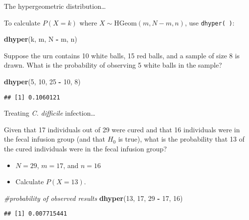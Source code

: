\documentclass[
  ignorenonframetext,
  aspectratio=169]{beamer}
\newenvironment{Shaded}{\begin{snugshade}}{\end{snugshade}}
\newcommand{\CommentTok}[1]{\textcolor[rgb]{0.56,0.35,0.01}{\textit{#1}}}
\newcommand{\DecValTok}[1]{\textcolor[rgb]{0.00,0.00,0.81}{#1}}
\newcommand{\FunctionTok}[1]{\textcolor[rgb]{0.13,0.29,0.53}{\textbf{#1}}}
\newcommand{\NormalTok}[1]{#1}
\newcommand{\SpecialCharTok}[1]{\textcolor[rgb]{0.81,0.36,0.00}{\textbf{#1}}}
\begin{document}
\begin{frame}[fragile]{The hypergeometric distribution\ldots{}}
\protect\hypertarget{the-hypergeometric-distribution-1}{}
\small

To calculate \(P(X = k)\) where \(X \sim \text{HGeom}(m, N - m, n)\),
use \texttt{dhyper( )}:

\vspace{0.2cm}

\scriptsize

\begin{Shaded}
\begin{Highlighting}[]
\FunctionTok{dhyper}\NormalTok{(k, m, N }\SpecialCharTok{{-}}\NormalTok{ m, n)}
\end{Highlighting}
\end{Shaded}

\small

Suppose the urn contains 10 white balls, 15 red balls, and a sample of
size 8 is drawn. What is the probability of observing 5 white balls in
the sample?

\scriptsize

\begin{Shaded}
\begin{Highlighting}[]
\FunctionTok{dhyper}\NormalTok{(}\DecValTok{5}\NormalTok{, }\DecValTok{10}\NormalTok{, }\DecValTok{25} \SpecialCharTok{{-}} \DecValTok{10}\NormalTok{, }\DecValTok{8}\NormalTok{)}
\end{Highlighting}
\end{Shaded}

\begin{verbatim}
## [1] 0.1060121
\end{verbatim}
\end{frame}

\begin{frame}[fragile]{Treating \emph{C. difficile} infection\ldots{}}
\protect\hypertarget{treating-c.-difficile-infection-1}{}
\small

Given that 17 individuals out of 29 were cured and that 16 individuals
were in the fecal infusion group (and that \(H_0\) is true), what is the
probability that 13 of the cured individuals were in the fecal infusion
group?

\begin{itemize}
\item
  \(N = 29\), \(m = 17\), and \(n = 16\)
\item
  Calculate \(P(X = 13)\).
\end{itemize}

\scriptsize

\begin{Shaded}
\begin{Highlighting}[]
\CommentTok{\#probability of observed results}
\FunctionTok{dhyper}\NormalTok{(}\DecValTok{13}\NormalTok{, }\DecValTok{17}\NormalTok{, }\DecValTok{29} \SpecialCharTok{{-}} \DecValTok{17}\NormalTok{, }\DecValTok{16}\NormalTok{)}
\end{Highlighting}
\end{Shaded}

\begin{verbatim}
## [1] 0.007715441
\end{verbatim}
\end{frame}
\end{document}
